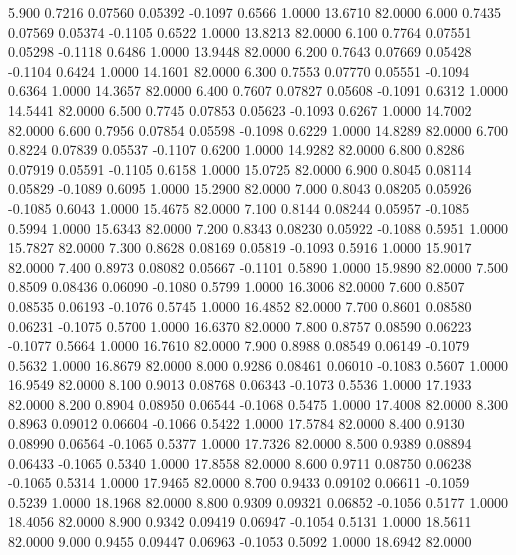   5.900   0.7216   0.07560   0.05392  -0.1097   0.6566   1.0000  13.6710  82.0000
   6.000   0.7435   0.07569   0.05374  -0.1105   0.6522   1.0000  13.8213  82.0000
   6.100   0.7764   0.07551   0.05298  -0.1118   0.6486   1.0000  13.9448  82.0000
   6.200   0.7643   0.07669   0.05428  -0.1104   0.6424   1.0000  14.1601  82.0000
   6.300   0.7553   0.07770   0.05551  -0.1094   0.6364   1.0000  14.3657  82.0000
   6.400   0.7607   0.07827   0.05608  -0.1091   0.6312   1.0000  14.5441  82.0000
   6.500   0.7745   0.07853   0.05623  -0.1093   0.6267   1.0000  14.7002  82.0000
   6.600   0.7956   0.07854   0.05598  -0.1098   0.6229   1.0000  14.8289  82.0000
   6.700   0.8224   0.07839   0.05537  -0.1107   0.6200   1.0000  14.9282  82.0000
   6.800   0.8286   0.07919   0.05591  -0.1105   0.6158   1.0000  15.0725  82.0000
   6.900   0.8045   0.08114   0.05829  -0.1089   0.6095   1.0000  15.2900  82.0000
   7.000   0.8043   0.08205   0.05926  -0.1085   0.6043   1.0000  15.4675  82.0000
   7.100   0.8144   0.08244   0.05957  -0.1085   0.5994   1.0000  15.6343  82.0000
   7.200   0.8343   0.08230   0.05922  -0.1088   0.5951   1.0000  15.7827  82.0000
   7.300   0.8628   0.08169   0.05819  -0.1093   0.5916   1.0000  15.9017  82.0000
   7.400   0.8973   0.08082   0.05667  -0.1101   0.5890   1.0000  15.9890  82.0000
   7.500   0.8509   0.08436   0.06090  -0.1080   0.5799   1.0000  16.3006  82.0000
   7.600   0.8507   0.08535   0.06193  -0.1076   0.5745   1.0000  16.4852  82.0000
   7.700   0.8601   0.08580   0.06231  -0.1075   0.5700   1.0000  16.6370  82.0000
   7.800   0.8757   0.08590   0.06223  -0.1077   0.5664   1.0000  16.7610  82.0000
   7.900   0.8988   0.08549   0.06149  -0.1079   0.5632   1.0000  16.8679  82.0000
   8.000   0.9286   0.08461   0.06010  -0.1083   0.5607   1.0000  16.9549  82.0000
   8.100   0.9013   0.08768   0.06343  -0.1073   0.5536   1.0000  17.1933  82.0000
   8.200   0.8904   0.08950   0.06544  -0.1068   0.5475   1.0000  17.4008  82.0000
   8.300   0.8963   0.09012   0.06604  -0.1066   0.5422   1.0000  17.5784  82.0000
   8.400   0.9130   0.08990   0.06564  -0.1065   0.5377   1.0000  17.7326  82.0000
   8.500   0.9389   0.08894   0.06433  -0.1065   0.5340   1.0000  17.8558  82.0000
   8.600   0.9711   0.08750   0.06238  -0.1065   0.5314   1.0000  17.9465  82.0000
   8.700   0.9433   0.09102   0.06611  -0.1059   0.5239   1.0000  18.1968  82.0000
   8.800   0.9309   0.09321   0.06852  -0.1056   0.5177   1.0000  18.4056  82.0000
   8.900   0.9342   0.09419   0.06947  -0.1054   0.5131   1.0000  18.5611  82.0000
   9.000   0.9455   0.09447   0.06963  -0.1053   0.5092   1.0000  18.6942  82.0000
